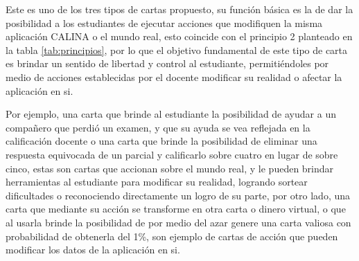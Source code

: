 Este es uno de los tres tipos de cartas propuesto, su función básica es la de dar la posibilidad a los 
estudiantes de ejecutar acciones que modifiquen la misma aplicación CALINA o el mundo real, esto coincide con 
el principio 2 planteado en la tabla \ref{tab:principios}, por lo que el objetivo fundamental de este tipo de 
carta es brindar un sentido de libertad y control al estudiante, permitiéndoles por medio de acciones 
establecidas por el docente modificar su realidad o afectar la aplicación en si.

Por ejemplo, una carta que brinde al estudiante la posibilidad de ayudar a un compañero que perdió un examen, 
y que su ayuda se vea reflejada en la calificación docente o una carta que brinde la posibilidad de eliminar 
una respuesta equivocada de un parcial y calificarlo sobre cuatro en lugar de sobre cinco, estas son cartas 
que accionan sobre el mundo real, y le pueden brindar herramientas al estudiante para modificar su realidad, 
logrando sortear dificultades o reconociendo directamente un logro de su parte, por otro lado, una carta que 
mediante su acción se transforme en otra carta o dinero virtual, o que al usarla brinde la posibilidad de por 
medio del azar genere una carta valiosa con probabilidad de obtenerla del 1\%, son ejemplo de cartas de acción 
que pueden modificar los datos de la aplicación en si.

